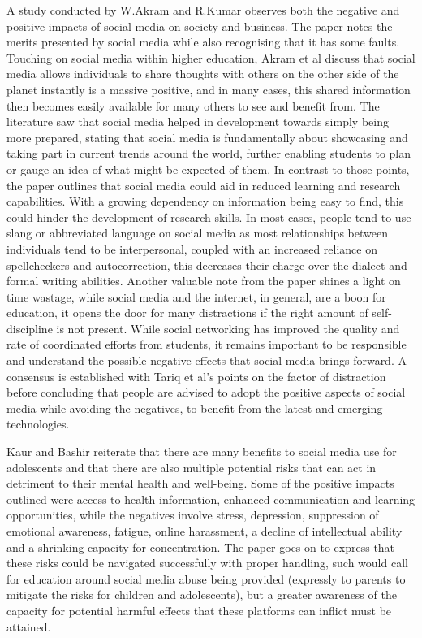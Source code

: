 \documentclass[lettersize,journal]{IEEEtran}
\begin{document}
    A study conducted by W.Akram and R.Kumar \cite{Akram et al 2017} observes both the negative
    and positive impacts of social media on society and business.  The paper notes the merits presented by social media
    while also recognising that it has some faults. Touching on social media within higher education, Akram et al
    discuss that social media allows individuals to share thoughts with others on the other side of the planet instantly
    is a massive positive, and in many cases, this shared information then becomes easily available for many others to
    see and benefit from. The literature saw that social media helped in development towards simply being more prepared, stating that
    social media is fundamentally about showcasing and taking part in  current trends around the world, further enabling students
    to plan or gauge an idea of what might be expected of them. In contrast to those points, the paper outlines that
    social media could aid in reduced learning and research capabilities. With a growing dependency on information
    being easy to find, this could hinder the development of research skills. In most cases, people tend to use slang or
    abbreviated language on social media as most relationships between individuals tend to be interpersonal, coupled
    with an increased reliance on spellcheckers and autocorrection, this decreases their charge over the dialect and
    formal writing abilities. Another valuable note from the paper shines a light on time wastage, while social media
    and the internet, in general, are a boon for education, it opens the door for many distractions if the right amount
   of self-discipline is not present. While social networking has improved the quality and rate of coordinated
    efforts from students, it remains important to be responsible and understand the possible negative effects
    that social media brings forward. A consensus is established with Tariq et al's \cite{Tariq et al 2012}
    points on the factor of distraction before concluding that people are advised to adopt the positive aspects of
    social media while avoiding the negatives, to benefit from the latest and emerging technologies.

    Kaur and Bashir \cite{Bashir et al 2015} reiterate that there are many benefits to social media use
    for adolescents and that there are also multiple potential risks that can act in detriment to their
    mental health and well-being. Some of the positive impacts outlined were access to health information,
    enhanced communication and learning opportunities, while the negatives involve stress, depression,
    suppression of emotional awareness, fatigue, online harassment, a decline of intellectual ability
    and a shrinking capacity for concentration. The paper goes on to express that these risks could be
    navigated successfully with proper handling, such would call for education around social media abuse
    being provided (expressly to parents to mitigate the risks for children and adolescents), but a greater
    awareness of the capacity for potential harmful effects that these platforms can inflict must be attained.
\end{document}
